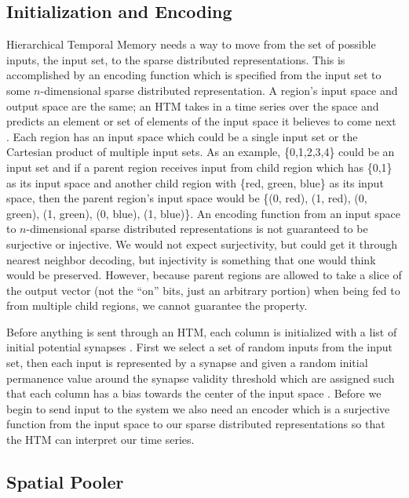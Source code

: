 \documentclass[fleqn,notitlepage,minimal]{article}
\begin{document}
	\subsection{Initialization and Encoding}
	
	Hierarchical Temporal Memory needs a way to move from the set of possible inputs, the input set, to the sparse distributed representations. This is accomplished by an encoding function which is specified from the input set to some $n$-dimensional sparse distributed representation. A region's input space and output space are the same; an HTM takes in a time series over the space and predicts an element or set of elements of the input space it believes to come next \cite{Purdy}. Each region has an input space which could be a single input set or the Cartesian product of multiple input sets. As an example, \{0,1,2,3,4\} could be an input set and if a parent region receives input from child region which has \{0,1\} as its input space and another child region with \{red, green, blue\} as its input space, then the parent region's input space would be \{(0, red), (1, red), (0, green), (1, green), (0, blue), (1, blue)\}. An encoding function from an input space to $n$-dimensional sparse distributed representations is not guaranteed to be surjective or injective. We would not expect surjectivity, but could get it through nearest neighbor decoding, but injectivity is something that one would think would be preserved. However, because parent regions are allowed to take a slice of the output vector (not the ``on'' bits, just an arbitrary portion) when being fed to from multiple child regions, we cannot guarantee the property.
	
	Before anything is sent through an HTM, each column is initialized with a list of initial potential synapses \cite{Whitepaper}. First we select a set of random inputs from the input set, then each input is represented by a synapse and given a random initial permanence value around the synapse validity threshold which are assigned such that each column has a bias towards the center of the input space \cite{Whitepaper}. Before we begin to send input to the system we also need an encoder which is a surjective function from the input space to our sparse distributed representations so that the HTM can interpret our time series.
	
	\subsection{Spatial Pooler}
	
\end{document}
